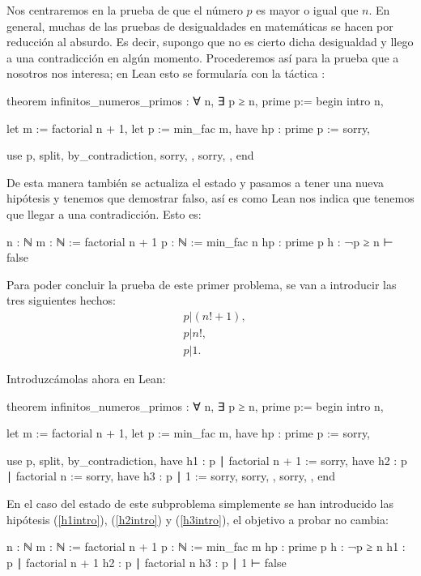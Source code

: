 Nos centraremos en la prueba de que el número \(p\) es mayor o igual que
\(n\).  En general, muchas de las pruebas de desigualdades en
matemáticas se hacen por reducción al absurdo. Es decir, supongo que no
es cierto dicha desigualdad y llego a una contradicción en algún
momento. Procederemos así para la prueba que a nosotros nos interesa; en
Lean esto se formularía con la táctica
:
\begin{leancode}
theorem infinitos_numeros_primos : ∀ n, ∃ p ≥ n, prime p:=
begin
  intro n,

  let m := factorial n + 1,
  let p := min_fac m,
  have hp : prime p := sorry,

  use p,
  split,
  { by_contradiction,
    sorry, },
  { sorry, },
end
\end{leancode}

De esta manera también se actualiza el estado y pasamos a tener una
nueva hipótesis y tenemos que demostrar falso, así es como Lean nos
indica que tenemos que llegar a una contradicción. Esto es:
\begin{leancode}
n : ℕ
m : ℕ := factorial n + 1
p : ℕ := min_fac n
hp : prime p
h : ¬p ≥ n
⊢ false
\end{leancode}

Para poder concluir la prueba de este primer problema, se van a introducir
las tres siguientes hechos:
\begin{align}
  &p | (n!+1),\tag{h1}\label{h1intro}\\
  &p | n!,    \tag{h2}\label{h2intro}\\
  &p | 1.     \tag{h3}\label{h3intro}
\end{align}

Introduzcámolas ahora en Lean:
\begin{leancode}
theorem infinitos_numeros_primos : ∀ n, ∃ p ≥ n, prime p:=
begin
  intro n,

  let m := factorial n + 1,
  let p := min_fac m,
  have hp : prime p := sorry,

  use p,
  split,
  { by_contradiction,
    have h1 : p ∣ factorial n + 1 := sorry,
    have h2 : p ∣ factorial n := sorry,
    have h3 : p ∣ 1 := sorry,
    sorry, },
  { sorry, },
end
\end{leancode}

En el caso del estado de este subproblema simplemente se han introducido las
hipótesis (\ref{h1intro}), (\ref{h2intro}) y (\ref{h3intro}), el objetivo a
probar no cambia:
\begin{leancode}
n : ℕ
m : ℕ := factorial n + 1
p : ℕ := min_fac m
hp : prime p
h : ¬p ≥ n
h1 : p ∣ factorial n + 1
h2 : p ∣ factorial n
h3 : p ∣ 1
⊢ false
\end{leancode}

